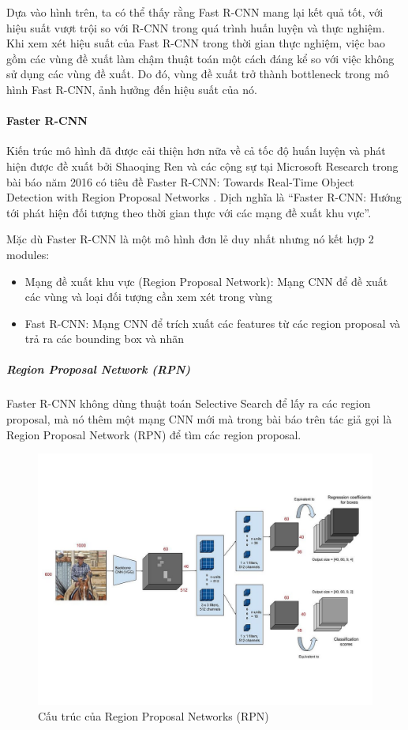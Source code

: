 Dựa vào hình trên, ta có thể thấy rằng Fast R-CNN mang lại kết quả tốt, với hiệu suất vượt trội so với R-CNN trong quá trình huấn luyện và thực nghiệm. Khi xem xét hiệu suất của Fast R-CNN trong thời gian thực nghiệm, việc bao gồm các vùng đề xuất làm chậm thuật toán một cách đáng kể so với việc không sử dụng các vùng đề xuất. Do đó, vùng đề xuất trở thành bottleneck trong mô hình Fast R-CNN, ảnh hưởng đến hiệu suất của nó.

\paragraph{Faster R-CNN\\}
Kiến trúc mô hình đã được cải thiện hơn nữa về cả tốc độ huấn luyện và phát hiện được đề xuất bởi Shaoqing Ren và các cộng sự tại Microsoft Research trong bài báo năm 2016 có tiêu đề Faster R-CNN: Towards Real-Time Object Detection with Region Proposal Networks \cite{fastercnn}. Dịch nghĩa là “Faster R-CNN: Hướng tới phát hiện đối tượng theo thời gian thực với các mạng đề xuất khu vực”.

Mặc dù Faster R-CNN là một mô hình đơn lẻ duy nhất nhưng nó kết hợp 2 modules:
\begin{itemize}[noitemsep, topsep=0pt, leftmargin=1.25em, label={$-$}]
    \item Mạng đề xuất khu vực (Region Proposal Network): Mạng CNN để đề xuất các vùng và loại đối tượng cần xem xét trong vùng
    \item Fast R-CNN: Mạng CNN để trích xuất các features từ các region proposal và trả ra các bounding box và nhãn
\end{itemize}

\subparagraph{Region Proposal Network (RPN)\\}
Faster R-CNN không dùng thuật toán Selective Search để lấy ra các region proposal, mà nó thêm một mạng CNN mới mà trong bài báo trên tác giả gọi là Region Proposal Network (RPN) để tìm các region proposal.

\graphicspath{{figures/}}
\begin{figure}[h!]
  \centering
  \includegraphics[scale=0.3]{graphics/rpn.jpg}
  \caption{Cấu trúc của Region Proposal Networks (RPN)}
\end{figure}

